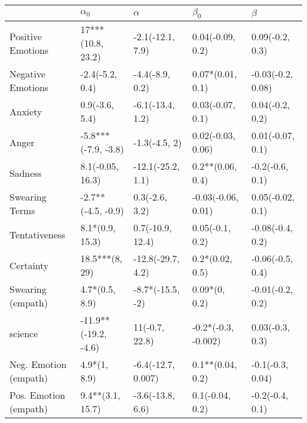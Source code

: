 \begin{tabular}{lllll}
\toprule
{} &            $\alpha_0$ &            $\alpha$ &            $\beta_0$ &            $\beta$ \\
\midrule
Positive Emotions     &     17***(10.8, 23.2) &    -2.1(-12.1, 7.9) &     0.04(-0.09, 0.2) &    0.09(-0.2, 0.3) \\
Negative Emotions     &       -2.4(-5.2, 0.4) &     -4.4(-8.9, 0.2) &     0.07*(0.01, 0.1) &  -0.03(-0.2, 0.08) \\
Anxiety               &        0.9(-3.6, 5.4) &    -6.1(-13.4, 1.2) &     0.03(-0.07, 0.1) &    0.04(-0.2, 0.2) \\
Anger                 &   -5.8***(-7.9, -3.8) &       -1.3(-4.5, 2) &    0.02(-0.03, 0.06) &   0.01(-0.07, 0.1) \\
Sadness               &      8.1(-0.05, 16.3) &   -12.1(-25.2, 1.1) &     0.2**(0.06, 0.4) &    -0.2(-0.6, 0.1) \\
Swearing Terms        &    -2.7**(-4.5, -0.9) &      0.3(-2.6, 3.2) &   -0.03(-0.06, 0.01) &   0.05(-0.02, 0.1) \\
Tentativeness         &       8.1*(0.9, 15.3) &    0.7(-10.9, 12.4) &      0.05(-0.1, 0.2) &   -0.08(-0.4, 0.2) \\
Certainty             &        18.5***(8, 29) &   -12.8(-29.7, 4.2) &      0.2*(0.02, 0.5) &   -0.06(-0.5, 0.4) \\
Swearing (empath)     &        4.7*(0.5, 8.9) &    -8.7*(-15.5, -2) &        0.09*(0, 0.2) &   -0.01(-0.2, 0.2) \\
science               &  -11.9**(-19.2, -4.6) &      11(-0.7, 22.8) &  -0.2*(-0.3, -0.002) &    0.03(-0.3, 0.3) \\
Neg. Emotion (empath) &          4.9*(1, 8.9) &  -6.4(-12.7, 0.007) &     0.1**(0.04, 0.2) &   -0.1(-0.3, 0.04) \\
Pos. Emotion (empath) &      9.4**(3.1, 15.7) &    -3.6(-13.8, 6.6) &      0.1(-0.04, 0.2) &    -0.2(-0.4, 0.1) \\
\bottomrule
\end{tabular}

